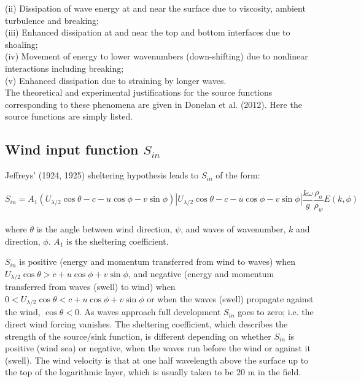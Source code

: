 \documentclass[letterpaper]{article}
\numberwithin{equation}{section}
\begin{document}
(ii) Dissipation of wave energy at and near the surface due to viscosity, ambient turbulence and breaking; \\

(iii) Enhanced dissipation at and near the top and bottom interfaces due to shoaling; \\

(iv) Movement of energy to lower wavenumbers (down-shifting) due to nonlinear interactions including breaking; \\

(v) Enhanced dissipation due to straining by longer waves. \\

The theoretical and experimental justifications for the source functions 
corresponding to these phenomena are given in Donelan et al. (2012). 
Here the source functions are simply listed.

\subsection{Wind input function $S_{in}$}

Jeffreys' (1924, 1925) sheltering hypothesis leads to $S_{in}$ of the form:

\begin{equation}
S_{in}=A_{1}\left(U_{\lambda/2}\cos{\theta}-c-u\cos{\phi}-v\sin{\phi}\right)
            \left|U_{\lambda/2}\cos{\theta}-c-u\cos{\phi}-v\sin{\phi}\right|
            \dfrac{k\omega}{g}\dfrac{\rho_{a}}{\rho_{w}}E(k,\phi)
\label{sin1} 
\end{equation}
\\
where $\theta$ is the angle between wind direction, $\psi$,
and waves of wavenumber, $k$ and direction, $\phi$. $A_{1}$ is the sheltering coefficient.

$S_{in}$ is positive (energy and momentum transferred from wind to waves)
when $U_{\lambda/2}\cos{\theta}>c+u\cos{\phi}+v\sin{\phi}$,
and negative (energy and momentum transferred from waves (swell) to wind)
when $0<U_{\lambda/2}\cos{\theta}<c+u\cos{\phi}+v\sin{\phi}$ or
when the waves (swell) propagate against the wind, $\cos{\theta}<0$.
As waves approach full development $S_{in}$ goes to zero; i.e. the direct wind forcing vanishes.
The sheltering coefficient, which describes the strength of the source/sink function,
is different depending on whether $S_{in}$ is positive (wind sea) or negative, when the waves
run before the wind or against it (swell).
The wind velocity is that at one half wavelength above the surface up to the top of the logarithmic layer,
which is usually taken to be $20$ m in the field.
\end{document}
